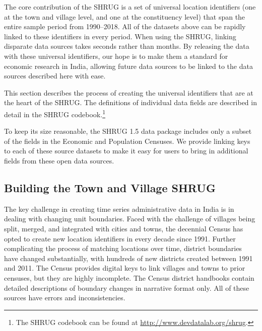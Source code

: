 \documentclass[12pt,letterpaper]{article}
\begin{document}
The core contribution of the SHRUG is a set of universal location
identifiers (one at the town and village level, and one at the
constituency level) that span the entire sample period from
1990--2018. All of the datasets above can be rapidly linked to these
identifiers in every period. When using the SHRUG, linking disparate
data sources takes seconds rather than months. By releasing the data
with these universal identifiers, our hope is to make them a standard
for economic research in India, allowing future data sources to be
linked to the data sources described here with ease.

This section describes the process of creating the universal
identifiers that are at the heart of the SHRUG. The definitions of
individual data fields are described in detail in the SHRUG
codebook.\footnote{The SHRUG codebook can be found at
  \href{http://www.devdatalab.org/shrug}{http://www.devdatalab.org/shrug}.}

To keep its size reasonable, the SHRUG 1.5 data package includes only
a subset of the fields in the Economic and Population Censuses. We
provide linking keys to each of these source datasets to make it easy
for users to bring in additional fields from these open data sources.

\subsection*{Building the Town and Village SHRUG}

The key challenge in creating time series administrative data in India
is in dealing with changing unit boundaries. Faced with the challenge
of villages being split, merged, and integrated with cities and towns,
the decennial Census has opted to create new location identifiers in
every decade since 1991. Further complicating the process of matching
locations over time, district boundaries have changed substantially,
with hundreds of new districts created between 1991 and 2011.  The
Census provides digital keys to link villages and towns to prior
censuses, but they are highly incomplete. The Census district
handbooks contain detailed descriptions of boundary changes in
narrative format only. All of these sources have errors and
inconsistencies.
\end{document}
